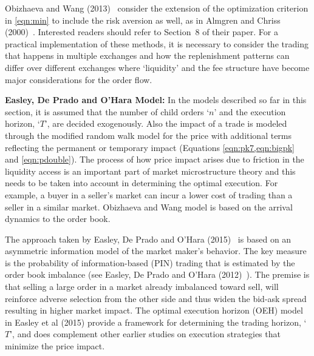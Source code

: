 Obizhaeva and Wang (2013)~\cite{obizhaeva} consider the extension of the optimization criterion in \eqref{eqn:min} to include the risk aversion as well, as in Almgren and Chriss (2000)~\cite{alm2000}. Interested readers should refer to Section~8 of their paper. For a practical implementation of these methods, it is necessary to consider the trading that happens in multiple exchanges and how the replenishment patterns can differ over different exchanges where `liquidity' and the fee structure have become major considerations for the order flow. \twomedskip


\noindent\textbf{Easley, De Prado and O'Hara Model:} In the models described so far in this section, it is assumed that the number of child orders `$n$' and the execution horizon, `$T$', are decided exogenously. Also the impact of a trade is modeled through the modified random walk model for the price with additional terms reflecting the permanent or temporary impact (Equations \ref{eqn:pk7,eqn:bigpk} and \ref{eqn:pdouble}). The process of how price impact arises due to friction in the liquidity access is an important part of market microstructure theory and this needs to be taken into account in determining the optimal execution. For example, a buyer in a seller's market can incur a lower cost of trading than a seller in a similar market. Obizhaeva and Wang model is based on the arrival dynamics to the order book. 


The approach taken by Easley, De Prado and O'Hara (2015)~\cite{prado2} is based on an asymmetric information model of the market maker's behavior. The key measure is the probability of information-based (PIN) trading that is estimated by the order book imbalance (see Easley, De Prado and O'Hara (2012)~\cite{prado3}). The premise is that selling a large order in a market already imbalanced toward sell, will reinforce adverse selection from the other side and thus widen the bid-ask spread resulting in higher market impact. The optimal execution horizon (OEH) model in Easley et al (2015) provide a framework for determining the trading horizon, `$T$', and does complement other earlier studies on execution strategies that minimize the price impact. 


